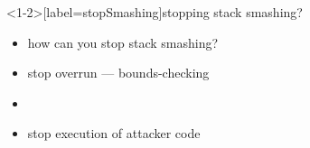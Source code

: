 
\begin{frame}<1-2>[label=stopSmashing]{stopping stack smashing?}
    \begin{itemize}
    \item how can you stop stack smashing?
    \vspace{.5cm}
    \item<2-> stop overrun --- bounds-checking
    \item<2-> 
    \item<2-> stop execution of attacker code
    \end{itemize}
\end{frame}



